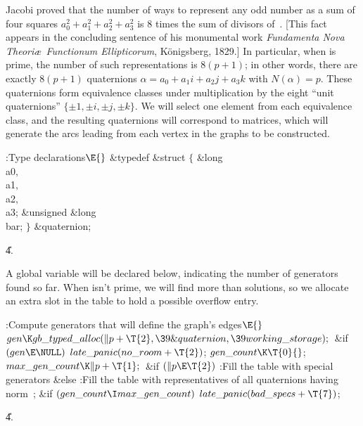 Jacobi proved that the number of ways to represent
any odd number  as a sum of four squares $a_0^2+a_1^2+a_2^2+a_3^2$
is 8 times the sum of divisors of~. [This fact appears in the
concluding sentence of his monumental work {\sl Fundamenta Nova
Theori\ae\ Functionum Ellipticorum}, K\"onigsberg, 1829.]
In particular, when  is prime,
the number of such representations is $8(p+1)$; in other words, there are
exactly $8(p+1)$ quaternions $\alpha=a_0+a_1i+a_2j+a_3k$ with $N(\alpha)=p$.
These quaternions form  equivalence classes under
multiplication
by the eight ``unit quaternions'' $\{\pm1,\pm i,\pm j,\pm k\}$. We will
select one element from each equivalence class, and the resulting 
quaternions will correspond to  matrices, which will generate
the 
arcs leading from each vertex in the graphs to be constructed.

\Y\B\4:Type declarations\X${}\E{}$\6
\&{typedef} \&{struct} ${}\{{}$\1\6
\&{long} \\{a0}${},{}$ \\{a1}${},{}$ \\{a2}${},{}$ \\{a3};\6
\&{unsigned} \&{long} \\{bar};\2\6
${}\}{}$ \&{quaternion};\par
\U4.\fi

A global variable  will be declared below,
indicating the number of generators found so far. When  isn't prime,
we will find more than  solutions, so we allocate an extra slot
in
the  table to hold a possible overflow entry.

\Y\B\4:Compute  generators that will define the graph's
edges\X${}\E{}$\6
$\\{gen}\K\\{gb\_typed\_alloc}(\|p+\T{2},\39\&{quaternion},\39\\{working%
\_storage});{}$\6
\&{if} ${}(\\{gen}\E\NULL){}$\1\5
${}\\{late\_panic}(\\{no\_room}+\T{2}){}$;\2\6
${}\\{gen\_count}\K\T{0}{}$;\5
${}\\{max\_gen\_count}\K\|p+\T{1};{}$\6
\&{if} ${}(\|p\E\T{2}){}$\1\5
:Fill the  table with special generators\X\2\6
\&{else}\1\5
:Fill the  table with representatives of all quaternions having
norm~\X;\2\6
\&{if} ${}(\\{gen\_count}\I\\{max\_gen\_count}){}$\1\5
${}\\{late\_panic}(\\{bad\_specs}+\T{7}){}$;\2\par
\U4.\fi

